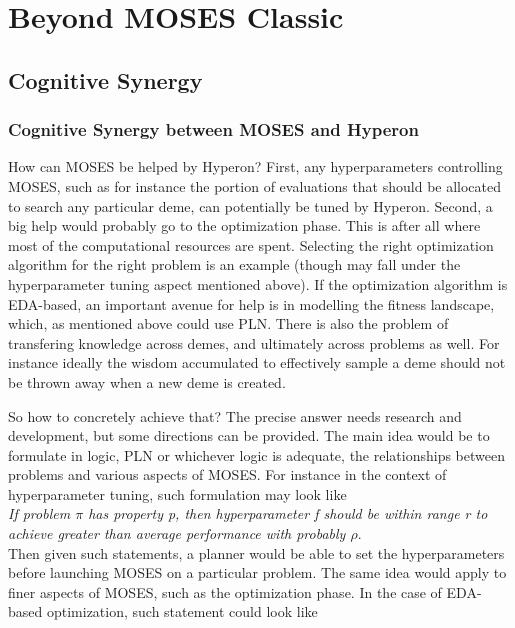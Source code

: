 \documentclass[]{report}
\begin{document}
\chapter{Beyond MOSES Classic}

\section{Cognitive Synergy}

\subsection{Cognitive Synergy between MOSES and Hyperon}
How can MOSES be helped by Hyperon?  First, any hyperparameters
controlling MOSES, such as for instance the portion of evaluations
that should be allocated to search any particular deme, can
potentially be tuned by Hyperon.  Second, a big help would probably go
to the optimization phase.  This is after all where most of the
computational resources are spent.  Selecting the right optimization
algorithm for the right problem is an example (though may fall under
the hyperparameter tuning aspect mentioned above).  If the
optimization algorithm is EDA-based, an important avenue for help is
in modelling the fitness landscape, which, as mentioned above could
use PLN.  There is also the problem of transfering knowledge across
demes, and ultimately across problems as well.  For instance ideally
the wisdom accumulated to effectively sample a deme should not be
thrown away when a new deme is created.

So how to concretely achieve that?  The precise answer needs research
and development, but some directions can be provided.  The main idea
would be to formulate in logic, PLN or whichever logic is adequate,
the relationships between problems and various aspects of MOSES.  For
instance in the context of hyperparameter tuning, such formulation may
look like\\

\emph{If problem $\pi$ has property p, then hyperparameter f should be within
range r to achieve greater than average performance with probably
$\rho$}.\\

Then given such statements, a planner would be able to set the
hyperparameters before launching MOSES on a particular problem.  The
same idea would apply to finer aspects of MOSES, such as the
optimization phase.  In the case of EDA-based optimization, such
statement could look like\\
\end{document}
